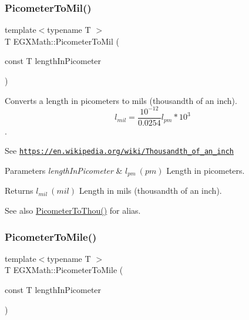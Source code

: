 \subsubsection{\texorpdfstring{Picometer\+To\+Mil()}{PicometerToMil()}}
{\footnotesize\ttfamily template$<$typename T $>$ \\
T E\+G\+X\+Math\+::\+Picometer\+To\+Mil (\begin{DoxyParamCaption}\item[{const T}]{length\+In\+Picometer }\end{DoxyParamCaption})}



Converts a length in picometers to mils (thousandth of an inch). \[ l_{mil}= \frac{10^{-12}}{0.0254} l_{pm} * 10^{3} \]. 

See \href{https://en.wikipedia.org/wiki/Thousandth_of_an_inch}{\tt https\+://en.\+wikipedia.\+org/wiki/\+Thousandth\+\_\+of\+\_\+an\+\_\+inch} 
\begin{DoxyParams}{Parameters}
{\em length\+In\+Picometer} & $ l_{pm}\ (pm)$ Length in picometers. \\
\hline
\end{DoxyParams}
\begin{DoxyReturn}{Returns}
$ l_{mil}\ (mil)$ Length in mils (thousandth of an inch). 
\end{DoxyReturn}
\begin{DoxySeeAlso}{See also}
\mbox{\hyperlink{group___e_g_x_math-_conversions-_length_conversions-_s_i-_picometer-_imperial_gabf48007bf90e25f6d23f847101fd35f1}{Picometer\+To\+Thou()}} for alias. 
\end{DoxySeeAlso}
\mbox{\label{group___e_g_x_math-_conversions-_length_conversions-_s_i-_picometer-_imperial_gae153bd94c8377dd95b8b09bcc56256b0}} 
\subsubsection{\texorpdfstring{Picometer\+To\+Mile()}{PicometerToMile()}}
{\footnotesize\ttfamily template$<$typename T $>$ \\
T E\+G\+X\+Math\+::\+Picometer\+To\+Mile (\begin{DoxyParamCaption}\item[{const T}]{length\+In\+Picometer }\end{DoxyParamCaption})}



